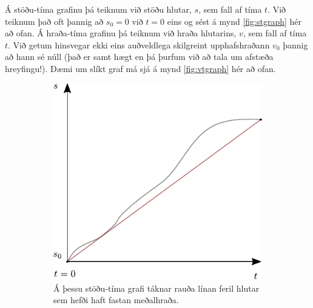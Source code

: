 Á stöðu-tíma grafinu þá teiknum við stöðu hlutar, $s$, sem fall af tíma $t$. Við teiknum það oft þannig að $s_0 = 0$ við $t = 0$ eins og sést á mynd \ref{fig:stgraph} hér að ofan. Á hraða-tíma grafinu þá teiknum við hraða hlutarins, $v$, sem fall af tíma $t$. Við getum hinsvegar ekki eins auðveldlega skilgreint upphafshraðann $v_0$ þannig að hann sé núll (það er samt hægt en þá þurfum við að tala um afstæða hreyfingu!). Dæmi um slíkt graf má sjá á mynd \ref{fig:vtgraph} hér að ofan. \\


\begin{figure}[H]
    \centering
\begin{subfigure}[h]{.4\textwidth}
    \centering
    \includegraphics[width=\linewidth]{figures/stodutimagraf-medalhradi.pdf}
    \caption{Á þessu stöðu-tíma grafi táknar rauða línan feril hlutar sem hefði haft fastan meðalhraða.}
    \label{fig:st-medalhradi}
\end{subfigure}
\hfill
\begin{subfigure}[h]{.4\textwidth}
    \centering

\end{subfigure}
\end{figure}
